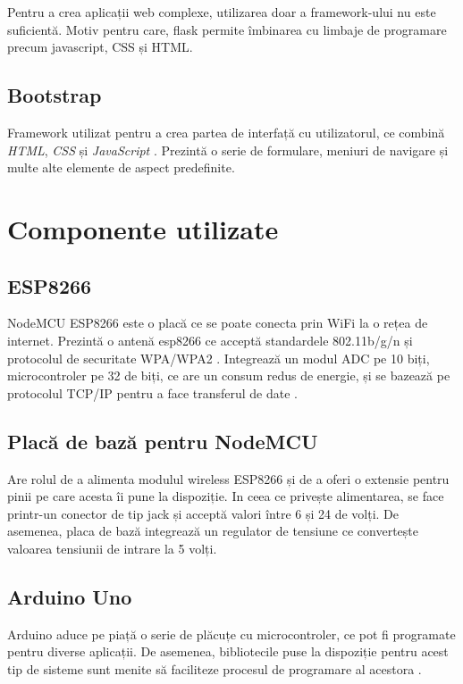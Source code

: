 	Pentru a crea aplicații web complexe, utilizarea doar a framework-ului nu este suficientă. Motiv pentru care, flask permite îmbinarea cu limbaje de programare precum javascript, CSS și HTML.

\subsection{Bootstrap}

	Framework utilizat pentru a crea partea de interfață cu utilizatorul, ce combină \textit{HTML}, \textit{CSS} și \textit{JavaScript} \cite{bootstrap}. Prezintă o serie de formulare, meniuri de navigare și multe alte elemente de aspect predefinite.  


\section{Componente utilizate}

\subsection{ESP8266}

	NodeMCU ESP8266 este o placă ce se poate conecta prin WiFi la o rețea de internet. Prezintă o antenă esp8266 ce acceptă standardele 802.11b/g/n și protocolul de securitate WPA/WPA2 \cite{esp8266}. Integrează un modul ADC pe 10 biți, microcontroler pe 32 de biți, ce are un consum redus de energie, și se bazează pe protocolul TCP/IP pentru a face transferul de date \cite{esp8266}.

\subsection{Placă de bază pentru NodeMCU}

	Are rolul de a alimenta modulul wireless ESP8266 și de a oferi o extensie pentru pinii pe care acesta îi pune la dispoziție. In ceea ce privește alimentarea, se face printr-un conector de tip jack și acceptă valori între 6 și 24 de volți. De asemenea, placa de bază integrează un regulator de tensiune ce convertește valoarea tensiunii de intrare la 5 volți.

\subsection{Arduino Uno}

	Arduino aduce pe piață o serie de plăcuțe cu microcontroler, ce pot fi programate pentru diverse aplicații. De asemenea, bibliotecile puse la dispoziție pentru acest tip de sisteme sunt menite să faciliteze procesul de programare al acestora \cite{arduino}.

